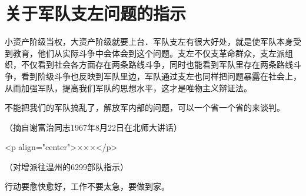 \section[关于军队支左问题的指示（一九六七年八月）]{关于军队支左问题的指示}


小资产阶级当权，大资产阶级就要上台．军队支左有很大好处，就是使军队本身受到教育，他们从实际斗争中会体会到这个问题。支左不仅支革命群众，支左派组织，不仅看到社会各方面存在两条路线斗争，同时也能看到军队里存在两条路线斗争，看到阶级斗争也反映到军队里边，军队通过支左也同样把问题暴露在社会上，从而加强军队，提高我们军队的思想水平，这才是唯物主义辩证法。

不能把我们的军队搞乱了，解放军内部的问题，可以一个省一个省的来谈判。

{\raggedleft （摘自谢富治同志1967年8月22日在北师大讲话）\par}

<p align="center">×××</p>

（对增派往温州的6299部队指示）

行动要愈快愈好，工作不要太急，要做到家。


